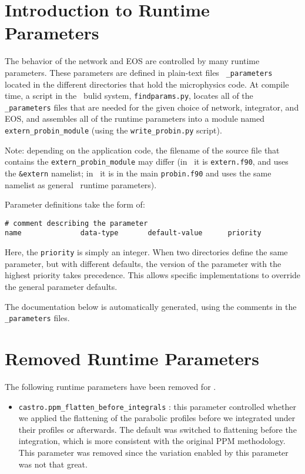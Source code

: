 \label{chapter:parameters}

\section{Introduction to Runtime Parameters}

The behavior of the network and EOS are controlled by many runtime
parameters.  These parameters are defined in plain-text files {\tt
  \_parameters} located in the different directories that hold the
microphysics code.  At compile time, a script in the \boxlib\ bulid
system, {\tt findparams.py}, locates all of the {\tt \_parameters}
files that are needed for the given choice of network, integrator, and
EOS, and assembles all of the runtime parameters into a module named
{\tt extern\_probin\_module} (using the {\tt write\_probin.py}
script).  

Note: depending on the application code, the filename of the source 
file that contains the {\tt extern\_probin\_module} may differ
(in \castro\ it is {\tt extern.f90}, and uses the {\tt \&extern} namelist;
in \maestro\ it is in the main {\tt probin.f90} and uses the same namelist
as general \maestro\ runtime parameters).

Parameter definitions take the form of:
\begin{verbatim}
# comment describing the parameter
name              data-type       default-value      priority
\end{verbatim}
Here, the {\tt priority} is simply an integer.  When two directories
define the same parameter, but with different defaults, the version of
the parameter with the highest priority takes precedence.  This allows
specific implementations to override the general parameter defaults.

The documentation below is automatically generated, using the comments
in the {\tt \_parameters} files.



\section{Removed Runtime Parameters}

The following runtime parameters have been removed for \castro.
\begin{itemize}
\item {\tt castro.ppm\_flatten\_before\_integrals} : this parameter
  controlled whether we applied the flattening of the parabolic
  profiles before we integrated under their profiles or afterwards.
  The default was switched to flattening before the integration,
  which is more consistent with the original PPM methodology.  This
  parameter was removed since the variation enabled by this parameter
  was not that great.
\end{itemize}

